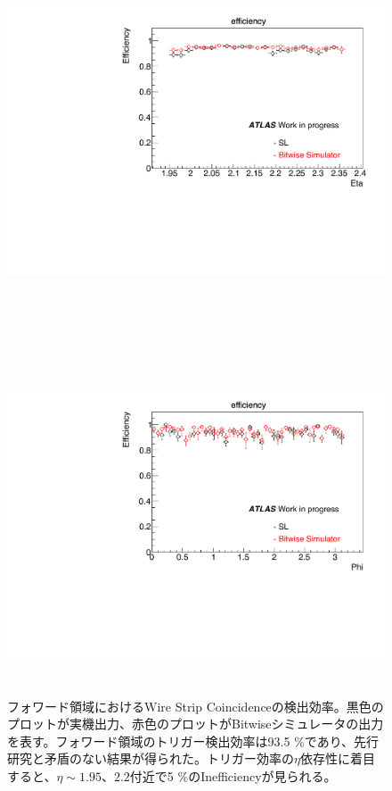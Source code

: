 \begin{figure}
    \begin{minipage}[b]{\linewidth}
    \centering
    \includegraphics[height=10cm]{fig/Test/A_SM_ws_eta.pdf}
    \end{minipage}\\
    \begin{minipage}[b]{\linewidth}
    \centering
    \includegraphics[height=10cm]{fig/Test/A_SM_ws_phi.pdf}
    \end{minipage}%
    \caption[Wire Strip Coincidenceの検出効率]{フォワード領域におけるWire Strip Coincidenceの検出効率。黒色のプロットが実機出力、赤色のプロットがBitwiseシミュレータの出力を表す。フォワード領域のトリガー検出効率は93.5 \%であり、先行研究と矛盾のない結果が得られた。トリガー効率の$\eta$依存性に着目すると、$\eta\sim1.95、2.2$付近で5 \%のInefficiencyが見られる。}
    \label{SM_A_WS}
\end{figure}

